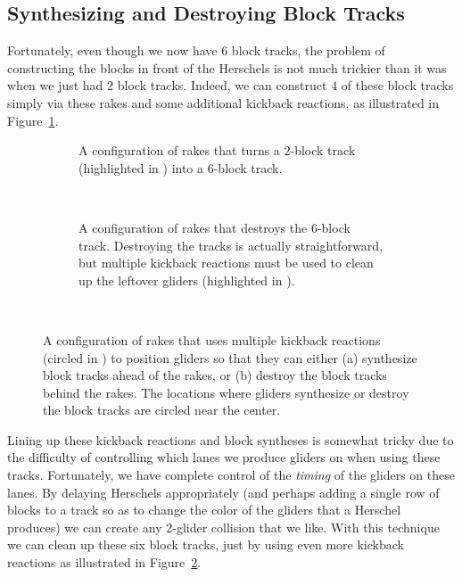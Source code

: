 \subsection{Synthesizing and Destroying Block Tracks}\label{sec:silverfish_synth_destroy_blocks}

Fortunately, even though we now have $6$ block tracks, the problem of constructing the blocks in front of the Herschels is not much trickier than it was when we just had $2$ block tracks. Indeed, we can construct $4$ of these block tracks simply via these rakes and some additional kickback reactions, as illustrated in Figure~\ref{fig:31c_240_track_builder}.

\begin{figure}[!htbp]
	\centering
	\begin{subfigure}{\textwidth}
		\centering
		\caption{A configuration of rakes that turns a $2$-block track (highlighted in ) into a $6$-block track.}\label{fig:31c_240_track_builder}
	\end{subfigure} \\[0.2cm]
	\begin{subfigure}{\textwidth}
		\centering
		\caption{A configuration of rakes that destroys the $6$-block track. Destroying the tracks is actually straightforward, but multiple kickback reactions must be used to clean up the leftover gliders (highlighted in ).}\label{fig:31c_240_track_destroyer}
	\end{subfigure} \\
	\caption{A configuration of rakes that uses multiple kickback reactions (circled in ) to position gliders so that they can either (a) synthesize block tracks ahead of the rakes, or (b) destroy the block tracks behind the rakes. The locations where gliders synthesize or destroy the block tracks are circled near the center.}\label{fig:31c_240_builder_destroyer}
\end{figure}

Lining up these kickback reactions and block syntheses is somewhat tricky due to the difficulty of controlling which lanes we produce gliders on when using these tracks. Fortunately, we have complete control of the \emph{timing} of the gliders on these lanes. By delaying Herschels appropriately (and perhaps adding a single row of blocks to a track so as to change the color of the gliders that a Herschel produces) we can create any $2$-glider collision that we like. With this technique we can clean up these six block tracks, just by using even more kickback reactions as illustrated in Figure~\ref{fig:31c_240_track_destroyer}.

